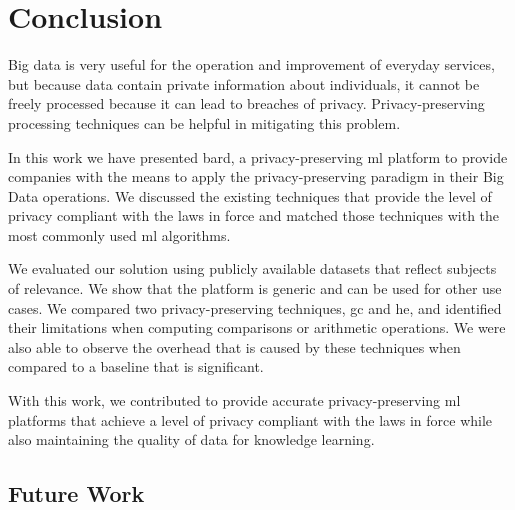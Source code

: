 %

\acresetall

\chapter{Conclusion}
\label{ch:ConclusionsAndFutureWork}


Big data is very useful for the operation and improvement of everyday services, but because data contain private information about individuals, it cannot be freely processed because it can lead to breaches of privacy. Privacy-preserving processing techniques can be helpful in mitigating this problem.

In this work we have presented \acs{bard}, a privacy-preserving \ac{ml} platform to provide companies with the means to apply the privacy-preserving paradigm in their Big Data operations. We discussed the existing techniques that provide the level of privacy compliant with the laws in force and matched those techniques with the most commonly used \ac{ml} algorithms.

We evaluated our solution using publicly available datasets that reflect subjects of relevance. We show that the platform is generic and can be used for other use cases. We compared two privacy-preserving techniques, \ac{gc} and \ac{he}, and identified their limitations when computing comparisons or arithmetic operations. We were also able to observe the overhead that is caused by these techniques when compared to a baseline that is significant.

With this work, we contributed to provide accurate privacy-preserving \ac{ml} platforms that achieve a level of privacy compliant with the laws in force while also maintaining the quality of data for knowledge learning.



\section{Future Work}
\label{sec:FutureWork}


